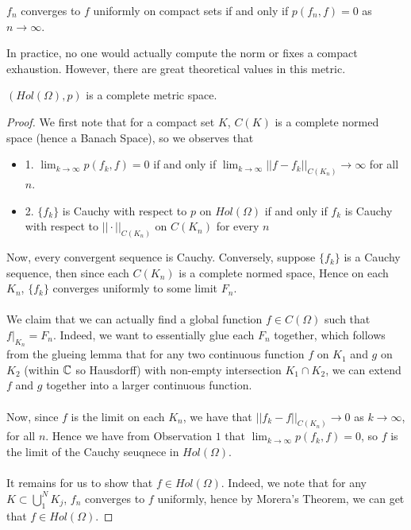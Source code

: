 \begin{proposition}
$f_n$ converges to $f$ uniformly on compact sets if and only if $p(f_n, f) = 0$ as $n \to \infty$.
\end{proposition}

In practice, no one would actually compute the norm or fixes a compact exhaustion. However, there are great theoretical values in this metric.

\begin{theorem}
$(Hol(\Omega), p)$ is a complete metric space.
\end{theorem}

\begin{proof}
We first note that for a compact set $K$, $C(K)$ is a complete normed space (hence a Banach Space), so we observes that
\begin{itemize}
    \item 1. $\lim_{k \to \infty} p(f_k, f) = 0$ if and only if $\lim_{k \to \infty} ||f - f_k||_{C(K_n)} \to \infty$ for all $n$.
    \item 2. $\{f_k\}$ is Cauchy with respect to $p$ on $Hol(\Omega)$ if and only if $f_k$ is Cauchy with respect to $||\cdot||_{C(K_n)}$ on $C(K_n)$ for every $n$ 
\end{itemize}
Now, every convergent sequence is Cauchy. Conversely, suppose $\{f_k\}$ is a Cauchy sequence, then since each $C(K_n)$ is a complete normed space, Hence on each $K_n$, $\{f_k\}$ converges uniformly to some limit $F_n$.\\\\
We claim that we can actually find a global function $f \in C(\Omega)$ such that $f|_{K_n} = F_n$. Indeed, we want to essentially glue each $F_n$ together, which follows from the glueing lemma that for any two continuous function $f$ on $K_1$ and $g$ on $K_2$ (within $\mathbb{C}$ so Hausdorff) with non-empty intersection $K_1 \cap K_2$, we can extend $f$ and $g$ together into a larger continuous function.\\\\
Now, since $f$ is the limit on each $K_n$, we have that $||f_k - f||_{C(K_n)} \to 0$ as $k \to \infty$, for all $n$. Hence we have from Observation $1$ that $\lim_{k \to \infty} p(f_k, f) = 0$, so $f$ is the limit of the Cauchy seuqnece in $Hol(\Omega)$.\\\\
It remains for us to show that $f \in Hol(\Omega)$. Indeed, we note that for any $K \subset \bigcup_1^N K_j$, $f_n$ converges to $f$ uniformly, hence by Morera's Theorem, we can get that $f \in Hol(\Omega)$.
\end{proof}

